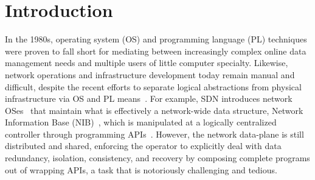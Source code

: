 \section{Introduction}
\label{sec:intro}


In the 1980s, operating system (OS) and programming language (PL)
techniques were proven to fall short for mediating between
increasingly complex online data management needs and multiple users
of little computer specialty. Likewise, network operations and
infrastructure development today remain manual and difficult, despite the
recent efforts to separate logical abstractions from physical
infrastructure via OS and PL
means~\cite{ethane-sigcomm07,rethinking-enterprise,shenker-tue}. For
example, SDN introduces network OSes~\cite{onix,nox} that maintain
what is effectively a
network-wide data structure, \eg Network Information Base
(NIB)~\cite{onix}, which is manipulated at a logically centralized
controller through programming
APIs~\cite{composing,sdn-lang-frenetic}. However, the network
data-plane is still distributed and shared, enforcing the operator to
explicitly deal with data redundancy, isolation, consistency, and
recovery by composing complete programs out of wrapping APIs, a task
that is notoriously challenging and tedious.  



